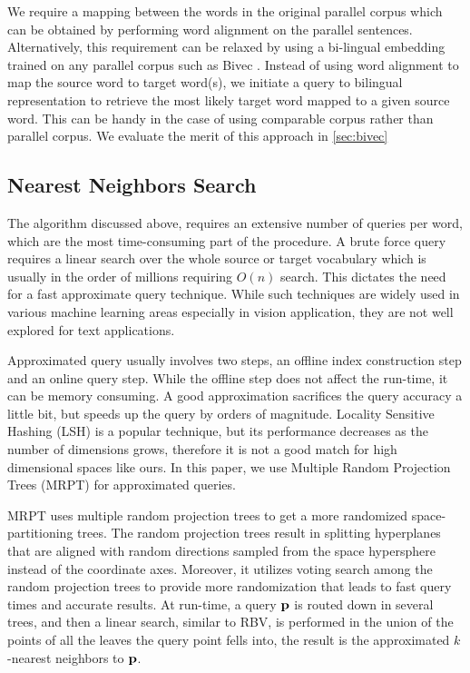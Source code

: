 \documentclass[a4paper]{article}
\begin{document}
We require a mapping between the words in the original parallel corpus which can be  obtained  by performing word alignment on the parallel sentences. Alternatively, this requirement can be relaxed by  using a bi-lingual embedding trained on any parallel corpus such as Bivec \cite{luong2015bilingual}. Instead of using word alignment to map the source word to target word(s), we initiate a query to bilingual representation to retrieve the most likely target  word mapped to a given source word. This can be handy in the case of using comparable corpus rather than parallel corpus. We evaluate the merit  of this approach in \textsection\ref{sec:bivec}


\subsection{Nearest Neighbors Search}
\label{sec:knn}

The algorithm discussed above, requires an extensive number of \knn queries per word, which are the most time-consuming part  of the procedure.  A brute force \knn query requires a linear search over the whole source or target vocabulary which is usually in the order of millions requiring   $O(n)$ search.  This dictates the need for a fast approximate \knn query technique. While such techniques are widely used in various machine learning areas especially in vision application, they are not well explored for text applications.

Approximated \knn query  usually involves two steps, an offline index construction step and an online query step. While the offline step does not affect the run-time, it can be memory consuming.
A good approximation sacrifices the query accuracy a little bit, but speeds up the query by orders of magnitude. Locality Sensitive Hashing (LSH) \cite{indyk1998approximate} is a popular technique, but its performance  decreases as the number of dimensions grows, therefore it is not a good match for high dimensional spaces like ours. In this paper, we use Multiple Random Projection Trees (MRPT) \cite{HyvonenPTJTWCR16} for approximated \knn queries.


MRPT \cite{HyvonenPTJTWCR16}  uses multiple random  projection  trees  to get a more  randomized
space-partitioning trees. The random projection trees  result in splitting  hyperplanes  that are  aligned  with   random  directions sampled  from  the  space hypersphere instead of the  coordinate  axes. Moreover, it utilizes voting search among the random projection trees to provide more randomization that leads to  fast  query  times  and  accurate  results. At run-time,  a query $\mathbf{p}$  is routed down in several trees, and then a   linear  search, similar to RBV, is  performed  in  the  union  of  the points of all the leaves the query point fells into, the result is the approximated $k$-nearest neighbors to $\mathbf{p}$.
\end{document}
